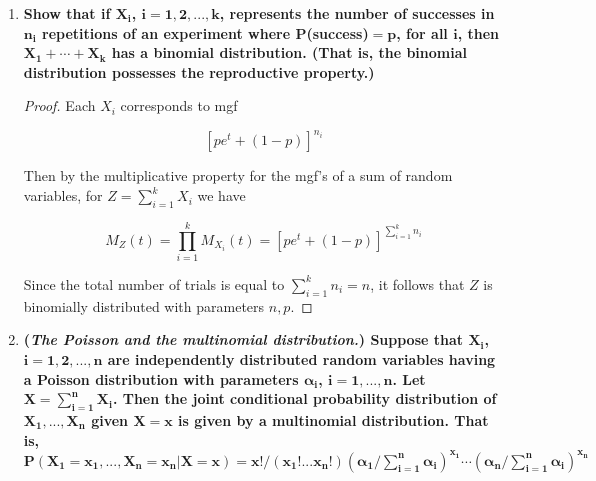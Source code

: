 \documentclass[10pt, oneside]{article}   	%
\theoremstyle{definition}
\newtheorem*{thm}{Theorem}
\begin{document}
\begin{enumerate}[label=10.\arabic*]
Since $X_i$, $i = 1,...,80$ are standard normal and independently and identically distributed, it follows that $S = \sum^{80}_{i=1} X^2_i \sim \chi^2_{80}$. In cases when the degrees of freedom for the chi-squared distribution is high, the following theorem allows us to approximate as a normal distribution:

\begin{thm}
Suppose that the random variable $Y$ has distribution $\chi^2_n$. Then for sufficiently large $n$ the random variable $\sqrt{2Y}$ has approximately the distribution $N(\sqrt{2n-1}, 1)$.
\end{thm}

\begin{align*}
P(S > 77) &= P(\sqrt{2S} > \sqrt{154}) \\
&= P(\sqrt{2S} - \sqrt{159} > \sqrt{154} - \sqrt{159}) \\
&= 1 - \Phi(\sqrt{154} - \sqrt{159}) \\
&= \boxed{0.5793}
\end{align*}

\item  \begin{tcolorbox}[
  colback=Cerulean!5!white,
  colframe=Cerulean!75!black]
\textbf{Show that if $\bm{X_i}$, $\bm{i = 1, 2, ..., k}$, represents the number of successes in $\bm{n_i}$ repetitions of an experiment where $\bm{P}$(success)$\bm{= p}$, for all $\bm{i}$, then $\bm{X_1 + \cdots + X_k}$ has a binomial distribution. (That is, the binomial distribution possesses the reproductive property.)}
\end{tcolorbox}

\begin{proof}
Each $X_i$ corresponds to mgf

\[ [pe^t + (1-p)]^{n_i} \]

Then by the multiplicative property for the mgf's of a sum of random variables, for $Z = \sum^k_{i=1} X_i$ we have

\[ M_Z(t) = \prod^k_{i=1} M_{X_i}(t) = [pe^t + (1-p)]^{\sum^k_{i=1} n_i} \]

Since the total number of trials is equal to $\sum^k_{i=1} n_i = n$, it follows that $Z$ is binomially distributed with parameters $n, p$.
\end{proof}

\item  \begin{tcolorbox}[
  colback=Cerulean!5!white,
  colframe=Cerulean!75!black]
\textbf{(\textit{The Poisson and the multinomial distribution.}) Suppose that $\bm{X_i}$, $\bm{i = 1, 2, ..., n}$ are independently distributed random variables having a Poisson distribution with parameters $\bm{\alpha_i}$, $\bm{i = 1, ..., n}$. Let $\bm{X = \sum^n_{i=1} X_i}$. Then the joint conditional probability distribution of $\bm{X_1, ..., X_n}$ given $\bm{X =x}$ is given by a multinomial distribution. That is, $\bm{P(X_1 = x_1, ..., X_n = x_n | X = x) = x! / (x_1!...x_n!) (\alpha_1 / \sum^n_{i=1} \alpha_i)^{x_1} \cdots (\alpha_n / \sum^n_{i=1} \alpha_i)^{x_n}}$}
\end{tcolorbox}


\end{enumerate}
\end{document}
